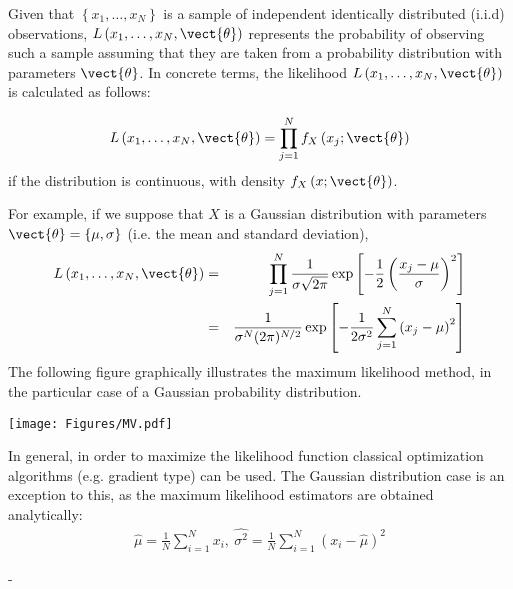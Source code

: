 {  Given that $\left\{x_1,\ldots,x_N \right\}$ is a sample of independent identically distributed (i.i.d) observations, $L\left(x_1,\ldots, x_N, \vect{\theta} \right)$ represents the probability of  observing such a sample assuming that they are taken from a probability distribution with parameters $\vect{\theta}$. In concrete terms, the likelihood $L\left(x_1,\ldots, x_N, \vect{\theta}\right)$ is calculated as follows:

  \begin{displaymath}
    L\left(x_1,\ldots, x_N, \vect{\theta} \right) = \prod_{j=1}^{N} f_X\left(x_j;\vect{\theta} \right)
  \end{displaymath}
  if the distribution is continuous, with density $f_X\left(x;\vect{\theta}\right)$.

  For example, if we suppose that $X$ is a Gaussian distribution with parameters $\vect{\theta}= \{ \mu,\sigma \}$  (i.e. the mean and standard deviation),
  \begin{eqnarray*}
    L\left(x_1,\ldots, x_N, \vect{\theta}\right) &=& \prod_{j=1}^{N} \frac{1}{\sigma \sqrt{2\pi}} \exp \left[ -\frac{1}{2} \left( \frac{x_j-\mu}{\sigma}  \right)^2  \right] \\
    &=& \frac{1}{\sigma^N (2\pi)^{N/2}} \exp \left[ -\frac{1}{2\sigma^2} \sum_{j=1}^N \left( x_j-\mu \right)^2  \right]
  \end{eqnarray*}
  The following figure graphically illustrates the maximum likelihood method, in the particular case of a Gaussian probability distribution.

  \begin{center}
    \texttt{[image: Figures/MV.pdf]}
  \end{center}

  In general, in order to maximize the likelihood function classical optimization algorithms (e.g. gradient type) can be used. The Gaussian distribution case is an exception to this, as the maximum likelihood estimators are obtained analytically:
  \begin{align*}
    \widehat{\mu}  = \frac{1}{N} \sum_{i=1}^N x_i,\ \widehat{\sigma^2} = \frac{1}{N} \sum_{i=1}^N \left( x_i - \widehat{\mu} \right)^2
  \end{align*}

}
{
  -
}


